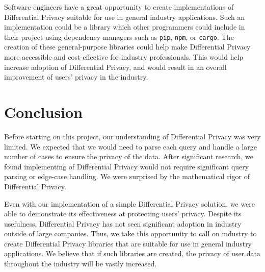 \documentclass[conference,11pt]{IEEEtran}
\begin{document}
Software engineers have a great opportunity to create implementations of
Differential Privacy suitable for use in general industry applications. Such an
implementation could be a library which other programmers could include in their
project using dependency managers such as \texttt{pip}, \texttt{npm}, or
\texttt{cargo}. The creation of these general-purpose libraries could help make
Differential Privacy more accessible and cost-effective for industry
professionals. This would help increase adoption of Differential Privacy, and
would result in an overall improvement of users' privacy in the industry.

\section{Conclusion}\label{sec:conclusion}
Before starting on this project, our understanding of Differential Privacy was
very limited. We expected that we would need to parse each query and handle a
large number of cases to ensure the privacy of the data.  After significant
research, we found implementing of Differential Privacy would not require
significant query parsing or edge-case handling. We were surprised by the
mathematical rigor of Differential Privacy.

Even with our implementation of a simple Differential Privacy solution, we were
able to demonstrate its effectiveness at protecting users' privacy. Despite its
usefulness, Differential Privacy has not seen significant adoption in industry
outside of large companies. Thus, we take this opportunity to call on industry
to create Differential Privacy libraries that are suitable for use in general
industry applications. We believe that if such libraries are created, the
privacy of user data throughout the industry will be vastly increased.

{\printbibliography}
\end{document}
